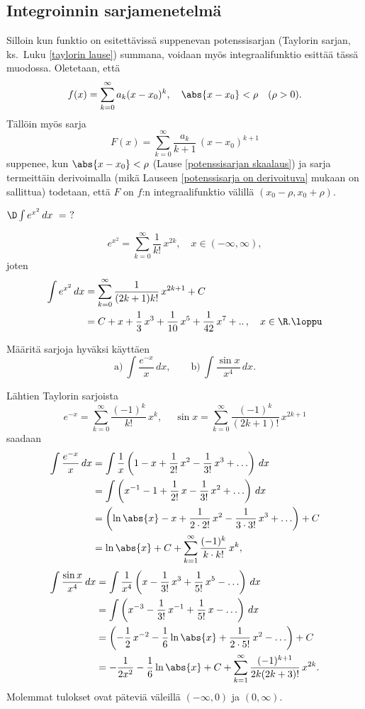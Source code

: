 \subsection{Integroinnin sarjamenetelmä}

Silloin kun funktio on esitettävissä suppenevan potenssisarjan (Taylorin sarjan, ks.\ Luku
\ref{taylorin lause}) summana, voidaan myös integraalifunktio esittää tässä muodossa.
Oletetaan, että
\[
f(x)=\sum_{k=0}^\infty a_k(x-x_0)^k,\quad \abs{x-x_0}<\rho \quad (\rho>0).
\]
Tällöin myös sarja
\[
F(x)=\sum_{k=0}^\infty \frac{a_k}{k+1}\,(x-x_0)^{k+1}
\]
suppenee, kun $\abs{x-x_0}<\rho$ (Lause \ref{potenssisarjan skaalaus}) ja sarja termeittäin 
derivoimalla (mikä Lauseen \ref{potenssisarja on derivoituva} mukaan on sallittua) todetaan,
että
$F$ on $f$:n integraalifunktio välillä $(x_0-\rho,x_0+\rho)$.
\begin{Exa}
$\D\int e^{x^2}\, dx\ =\ ?$
\end{Exa}
\ratk
\[
e^{x^2}=\sum_{k=0}^\infty \frac{1}{k!}\,x^{2k},\quad x \in (-\infty,\infty),
\]
joten
\begin{align*}
\int e^{x^2}\, dx 
      &= \sum_{k=0}^\infty \frac{1}{(2k+1)k!}\,x^{2k+1}+C \\
      &= C+x+\frac{1}{3}\,x^3+\frac{1}{10}\,x^5+\frac{1}{42}\,x^7+..\,,\quad x\in\R. \loppu
\end{align*}
\begin{Exa} Määritä sarjoja hyväksi käyttäen
\[
\text{a)}\ \int \frac{e^{-x}}{x}\,dx, \qquad
\text{b)}\ \int \frac{\sin x}{x^4}\,dx.
\]
\end{Exa} 
\ratk Lähtien Taylorin sarjoista
\[
e^{-x} = \sum_{k=0}^\infty \frac{(-1)^k}{k!}\,x^k, \quad\
\sin x = \sum_{k=0}^\infty \frac{(-1)^k}{(2k+1)!}\,x^{2k+1}
\]
saadaan
\begin{align*}
\int\frac{e^{-x}}{x}\,dx   
  &= \int \frac{1}{x}\left(1-x+\frac{1}{2!}\,x^2-\frac{1}{3!}\,x^3+\ldots\right)\,dx \\
  &= \int \left(x^{-1}-1+\frac{1}{2!}\,x-\frac{1}{3!}\,x^2+\ldots\right)\,dx \\
  &= \left(\ln\abs{x}-x+\frac{1}{2\cdot 2!}\,x^2-\frac{1}{3\cdot 3!}\,x^3+\ldots\right) + C \\
  &= \ln\abs{x} + C + \sum_{k=1}^\infty \frac{(-1)^k}{k\cdot k!}\,x^k,
\end{align*}
\begin{align*}
\int\frac{\sin x}{x^4}\,dx 
  &= \int \frac{1}{x^4}\left(x-\frac{1}{3!}\,x^3+\frac{1}{5!}\,x^5-\ldots\right)\,dx \\ 
  &= \int \left(x^{-3}-\frac{1}{3!}\,x^{-1}+\frac{1}{5!}\,x-\ldots\right)\,dx \\
  &= \left(-\frac{1}{2}\,x^{-2}-\frac{1}{6}\ln\abs{x}
                               +\frac{1}{2\cdot 5!}\,x^2-\ldots\right) +C \\
  &= -\frac{1}{2x^2}-\frac{1}{6}\ln\abs{x}+C
                    +\sum_{k=1}^\infty \frac{(-1)^{k+1}}{2k(2k+3)!}\,x^{2k}.
\end{align*}
Molemmat tulokset ovat päteviä väleillä $(-\infty,0)$ ja $(0,\infty)$. \loppu

